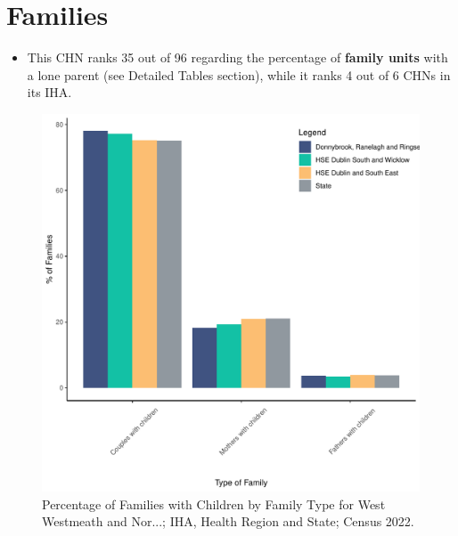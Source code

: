 \documentclass{article}
\begin{document}
\section{Families}\label{sect:Fam}
\begin{itemize}
\item This CHN ranks  35 out of 96 regarding the percentage of \textbf{family units} with a lone parent (see Detailed Tables section), while it ranks   4 out of 6 CHNs in its IHA.
\end{itemize}
\begin{figure}[H]
	\centering
	\includegraphics[width = 150mm]{../figures/FamED.pdf}
	\caption{Percentage of Families with Children by Family Type for West Westmeath and Nor...; IHA, Health Region and State; Census 2022.}
	\label{fig:vbnv}
	\end{figure}
	
\end{document}

